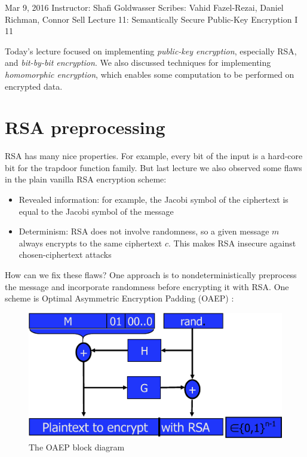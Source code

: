 \documentclass[10pt]{article}
\newcommand{\scribes}{Vahid Fazel-Rezai, Daniel Richman, Connor Sell}
\newcommand{\lecnumber}{11}
\newcommand{\lectitle}{Semantically Secure Public-Key Encryption I
}
\newcommand{\thedate}{Mar 9, 2016}
\begin{document}


{\thedate}
{Instructor: Shafi Goldwasser}
{Scribes: \scribes}
{Lecture \lecnumber: \lectitle}
{\lecnumber}


Today's lecture focused on implementing \textit{public-key encryption}, especially RSA, and \textit{bit-by-bit encryption}. We also discussed techniques for implementing \textit{homomorphic encryption}, which enables some computation to be performed on encrypted data. 

\section{RSA preprocessing}

RSA has many nice properties. For example, every bit of the input is a hard-core bit for the trapdoor function family. But last lecture we also observed some flaws in the plain vanilla RSA encryption scheme:
\begin{itemize}
  \item Revealed information: for example, the Jacobi symbol of the ciphertext is equal to the Jacobi symbol of the message
  \item Determinism: RSA does not involve randomness, so a given message $m$ always encrypts to the same ciphertext $c$. This makes RSA insecure against chosen-ciphertext attacks
\end{itemize}

How can we fix these flaws? One approach is to nondeterministically preprocess the message and incorporate randomness before encrypting it with RSA. One scheme is Optimal Asymmetric Encryption Padding (OAEP) \cite{Bellare1995}:

\begin{figure}['h']
\begin{center}
\includegraphics{oaep}
\end{center}
\caption{The OAEP block diagram}
\end{figure}
\end{document}
